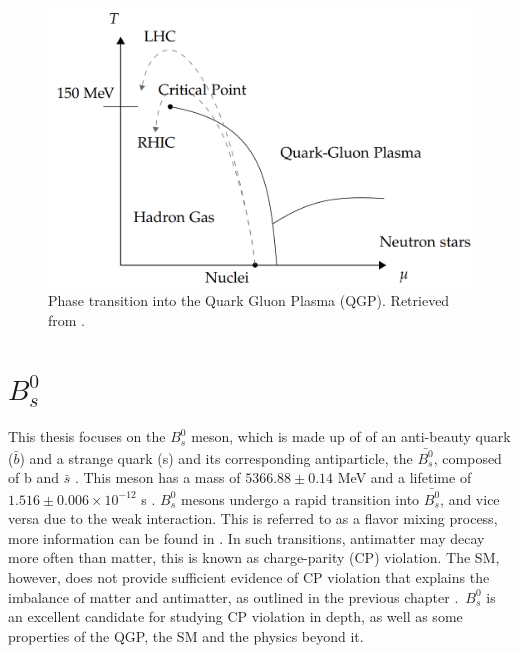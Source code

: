 \begin{figure}[htp!]
	\centering
	\includegraphics[scale=0.34]{MainContent/Figs/QGP.png}
	\caption{Phase transition into the Quark Gluon Plasma (QGP). Retrieved from \cite{parkkila2021quantifying}.}
	\label{fig:qgp}
\end{figure}

\section{$B^0_s$}
\label{sec:b0s}
This thesis focuses on the $B^0_s$ meson, which is made up of of an anti-beauty quark ($\bar{b}$) and a strange quark (s) and its corresponding antiparticle, the $\bar{B^0_s}$, composed of b and $\bar{s}$ \cite{mejia2012medida}. This meson has a mass of $5366.88 \pm 0.14$ MeV and a lifetime of $1.516\pm 0.006 \times 10^{-12}$ s \cite{pdgstrange}. $B^0_s$ mesons undergo a rapid transition into $\bar{B^0_s}$, and vice versa due to the weak interaction. This is referred to as a flavor mixing process, more information can be found in \cite{greevenanalysis, mejia2012medida}. In such transitions, antimatter may decay more often than matter, this is known as charge-parity (CP) violation. The SM, however, does not provide sufficient evidence of CP violation that explains the imbalance of matter and antimatter, as outlined in the previous chapter \cite{greevenanalysis, cern2020lhcb}. $B^0_s$ is an excellent candidate for studying CP violation in depth, as well as some properties of the QGP, the SM and the physics beyond it.

